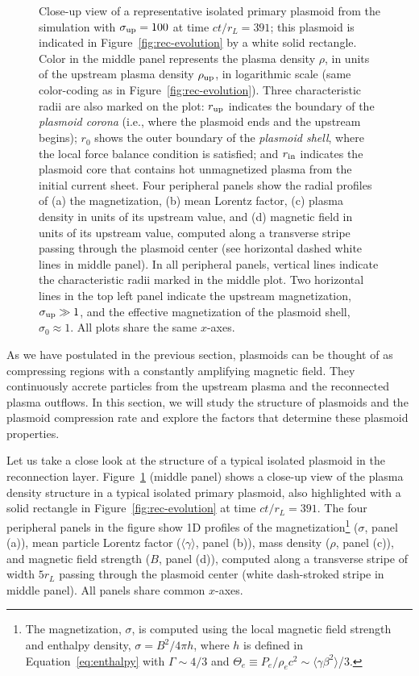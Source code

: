 \begin{figure}[htb]
{    }{
        \caption{Close-up view of a representative isolated primary plasmoid from the simulation with $\sigma_{\rm up}=100$ at time $ct/r_L=391$; this plasmoid is indicated in Figure~\ref{fig:rec-evolution} by a white solid rectangle. Color in the middle panel represents the plasma density $\rho$, in units of the upstream plasma density $\rho_{\rm up}$, in logarithmic scale (same color-coding as in Figure~\ref{fig:rec-evolution}). Three characteristic radii are also marked on the plot: $r_{\rm up}$ indicates the boundary of the {\it plasmoid corona} (i.e., where the plasmoid ends and the upstream begins); $r_0$ shows the outer boundary of the {\it plasmoid shell}, where the local force balance condition is satisfied; and $r_{\rm in}$ indicates the plasmoid core that contains hot unmagnetized plasma from the initial current sheet. Four peripheral panels show the radial profiles of (a) the magnetization, (b) mean Lorentz factor, (c) plasma density in units of its upstream value, and (d) magnetic field in units of its upstream value, computed along a transverse stripe passing through the plasmoid center (see horizontal dashed white lines in middle panel). In all peripheral panels, vertical lines indicate the characteristic radii marked in the middle plot. Two horizontal lines in the top left panel indicate the upstream magnetization, $\sigma_{\rm up} \gg 1$, and the effective magnetization of the plasmoid shell, $\sigma_0 \approx 1$. All plots share the same $x$-axes.}
        \label{fig:rec-plasm_example}
    }
\end{figure}

As we have postulated in the previous section, plasmoids can be thought of as compressing regions with a constantly amplifying magnetic field. They continuously accrete particles from the upstream plasma and the reconnected plasma outflows. In this section, we will study the structure of plasmoids and the plasmoid compression rate and explore the factors that determine these plasmoid properties. 

Let us take a close look at the structure of a typical isolated plasmoid in the reconnection layer. Figure~\ref{fig:rec-plasm_example} (middle panel) shows a close-up view of the plasma density structure in a typical isolated primary plasmoid, also highlighted with a solid rectangle in Figure~\ref{fig:rec-evolution} at time $ct/r_L = 391$. The four peripheral panels in the figure show 1D profiles of the magnetization\footnote{
The magnetization, $\sigma$, is computed using the local {magnetic field strength and} enthalpy density, $\sigma = B^2 / 4\pi h$, where  $h$ is defined in Equation~\eqref{eq:enthalpy} with $\Gamma\sim 4/3$ and $\Theta_e\equiv P_e/\rho_ec^2 \sim \langle\gamma\beta^2\rangle$/3.}
($\sigma$, panel (a)), mean particle Lorentz factor ($\langle\gamma\rangle$, panel (b)), mass density ($\rho$, panel (c)), and magnetic field strength ($B$, panel (d)), computed along a transverse stripe of width $5r_L$ passing through the plasmoid center (white dash-stroked stripe in middle panel). 
All panels share common $x$-axes. 

